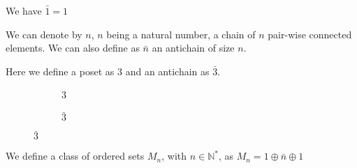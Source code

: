 \begin{remark}
  We have $\bar 1 = 1$
\end{remark}

\begin{notation}
  We can denote by $n$, $n$ being a natural number, a chain of $n$ pair-wise connected elements. We can also define as $\bar n$ an antichain of size $n$.
  \begin{example}
    Here we define a poset as $3$ and an antichain as $\bar 3$.

    \begin{figure}
      \centering
      \begin{subfigure}{0.5\textwidth}
        \centering
        \caption*{3}
      \end{subfigure}%
      \begin{subfigure}{0.5\textwidth}
        \centering
        \caption*{$\bar 3$}
      \end{subfigure}
    \end{figure}
  \end{example}
\end{notation}

\begin{definition}[$M_n$]
  We define a class of ordered sets $M_n$, with $n \in \mathbb{N}^*$, as $M_n = 1 \oplus \bar n \oplus 1$
\end{definition}

